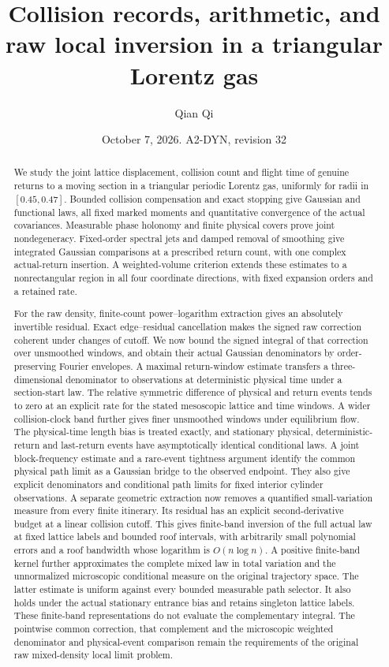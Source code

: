 \documentclass[11pt,reqno]{amsart}
\title[Collision records and raw local inversion]{Collision records, arithmetic, and raw local inversion in a triangular Lorentz gas}
\author{Qian Qi}
\date{October 7, 2026. A2-DYN, revision 32}
\numberwithin{equation}{section}
\theoremstyle{definition}\newtheorem{definition}[theorem]{Definition}
\theoremstyle{remark}\newtheorem{remark}[theorem]{Remark}
\begin{document}
\raggedbottom
\begin{abstract}
We study the joint lattice displacement, collision count and flight time
of genuine returns to a moving section in a triangular periodic Lorentz
gas, uniformly for radii in $[0.45,0.47]$. Bounded collision compensation
and exact stopping give Gaussian and functional laws, all fixed marked
moments and quantitative convergence of the actual covariances.
Measurable phase holonomy and finite physical covers prove joint
nondegeneracy. Fixed-order spectral jets and damped removal of smoothing
give integrated Gaussian comparisons at a prescribed return count,
with one complex actual-return insertion. A weighted-volume criterion
extends these estimates to a nonrectangular region in all four
coordinate directions, with fixed expansion orders and a retained rate.

For the raw density, finite-count power--logarithm extraction gives an
absolutely invertible residual. Exact edge--residual cancellation makes
the signed raw correction coherent under changes of cutoff. We now
bound the signed integral of that correction over unsmoothed windows,
and obtain their actual Gaussian denominators by order-preserving
Fourier envelopes. A maximal return-window estimate transfers a
three-dimensional denominator to observations at deterministic physical
time under a section-start law. The relative symmetric difference of
physical and return events tends to zero at an explicit rate for the
stated mesoscopic lattice and time windows. A wider collision-clock
band further gives finer unsmoothed windows under equilibrium flow.
The physical-time length bias is treated exactly, and stationary
physical, deterministic-return and last-return events have asymptotically
identical conditional laws. A joint block-frequency estimate and a
rare-event tightness argument identify the common physical path limit
as a Gaussian bridge to the observed endpoint. They also give explicit
denominators and conditional path limits for fixed interior cylinder
observations. A separate geometric extraction now removes a quantified
small-variation measure from every finite itinerary. Its residual has
an explicit second-derivative budget at a linear collision cutoff.
This gives finite-band inversion of the full actual law at fixed
lattice labels and bounded roof intervals, with arbitrarily small
polynomial errors and a roof bandwidth whose logarithm is $O(n\log n)$.
A positive finite-band kernel further approximates the complete mixed
law in total variation and the unnormalized microscopic conditional
measure on the original trajectory space. The latter estimate is uniform
against every bounded measurable path selector. It also holds under
the actual stationary entrance bias and retains singleton lattice labels.
These finite-band representations do not evaluate the complementary integral.
The pointwise common correction, that complement and the microscopic
weighted denominator and physical-event comparison remain the
requirements of the original raw mixed-density local limit problem.
\end{abstract}
\maketitle
\end{document}

